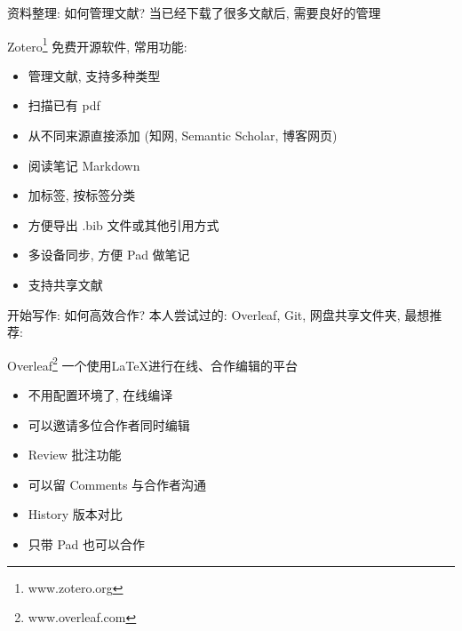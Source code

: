 \documentclass[UTF8]{ctexbeamer}
\begin{document}
\begin{frame}{资料整理: 如何管理文献?}
当已经下载了很多文献后, 需要良好的管理
\begin{alertblock}{Zotero\footnote{www.zotero.org}}
免费开源软件, 常用功能:
    \begin{itemize}
        \item 管理文献, 支持多种类型 
        \item 扫描已有 pdf 
        \item 从不同来源直接添加 (知网, Semantic Scholar, 博客网页)
        \item 阅读笔记 Markdown
        \item 加标签, 按标签分类
        \item 方便导出 .bib 文件或其他引用方式
        \item 多设备同步, 方便 Pad 做笔记
        \item 支持共享文献
    \end{itemize}
\end{alertblock}
\end{frame}

\begin{frame}{开始写作: 如何高效合作?}
本人尝试过的: Overleaf, Git, 网盘共享文件夹, 最想推荐:
\begin{alertblock}{Overleaf\footnote{www.overleaf.com}}
一个使用LaTeX进行在线、合作编辑的平台
    \begin{itemize}
        \item 不用配置环境了, 在线编译
        \item 可以邀请多位合作者同时编辑
        \item Review 批注功能
        \item 可以留 Comments 与合作者沟通
        \item History 版本对比
        \item 只带 Pad 也可以合作
    \end{itemize}
\end{alertblock}
\end{frame}


\end{document}
